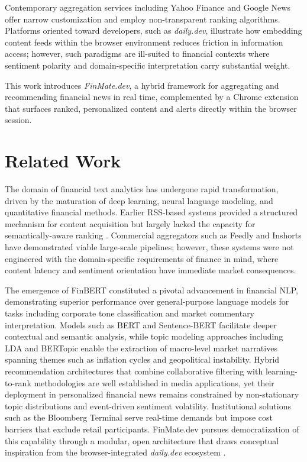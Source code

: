 \documentclass[conference]{IEEEtran}
\begin{document}
Contemporary aggregation services including Yahoo Finance and Google News offer narrow customization and employ non-transparent ranking algorithms. Platforms oriented toward developers, such as \textit{daily.dev}, illustrate how embedding content feeds within the browser environment reduces friction in information access; however, such paradigms are ill-suited to financial contexts where sentiment polarity and domain-specific interpretation carry substantial weight.

This work introduces \textit{FinMate.dev}, a hybrid framework for aggregating and recommending financial news in real time, complemented by a Chrome extension that surfaces ranked, personalized content and alerts directly within the browser session.

\section{Related Work}

The domain of financial text analytics has undergone rapid transformation, driven by the maturation of deep learning, neural language modeling, and quantitative financial methods. Earlier RSS-based systems provided a structured mechanism for content acquisition but largely lacked the capacity for semantically-aware ranking \cite{rss2020}. Commercial aggregators such as Feedly and Inshorts have demonstrated viable large-scale pipelines; however, these systems were not engineered with the domain-specific requirements of finance in mind, where content latency and sentiment orientation have immediate market consequences.

The emergence of FinBERT \cite{araci2019finbert} constituted a pivotal advancement in financial NLP, demonstrating superior performance over general-purpose language models for tasks including corporate tone classification and market commentary interpretation. Models such as BERT \cite{devlin2019bert} and Sentence-BERT \cite{reimers2019sbert} facilitate deeper contextual and semantic analysis, while topic modeling approaches including LDA \cite{blei2003lda} and BERTopic \cite{grootendorst2022bertopic} enable the extraction of macro-level market narratives spanning themes such as inflation cycles and geopolitical instability. Hybrid recommendation architectures that combine collaborative filtering with learning-to-rank methodologies \cite{burges2005} are well established in media applications, yet their deployment in personalized financial news remains constrained by non-stationary topic distributions and event-driven sentiment volatility. Institutional solutions such as the Bloomberg Terminal serve real-time demands but impose cost barriers that exclude retail participants. FinMate.dev pursues democratization of this capability through a modular, open architecture that draws conceptual inspiration from the browser-integrated \textit{daily.dev} ecosystem \cite{dailydev}.
\end{document}

